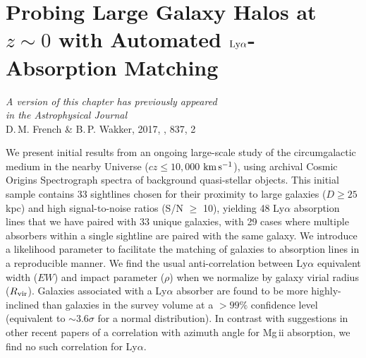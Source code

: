 \chapter[Probing Large Galaxy Halos at $z\sim0$ with Automated $\rm Ly\alpha$-Absorption Matching]{Probing Large Galaxy Halos at $z\sim0$ with Automated $\rm L \MakeLowercase{y} \alpha$-Absorption Matching} 
\label{chap:chap3}


\vfill


\begin{flushright}
    \fixspacing %
    \textit{A version of this chapter has previously appeared\\
        in the \emph{Astrophysical Journal}} \\ \vspace{1ex}
     D.\,M. French \& B.\,P. Wakker, 2017, \apj, 837, 2
\end{flushright}

\vspace*{1in} %

\cleardoublepage


\begin{chabstract}

We present initial results from an ongoing large-scale study of the circumgalactic medium in the nearby Universe ($cz \leq 10,000$ $\rm km\, s^{-1}$), using archival Cosmic Origins Spectrograph spectra of background quasi-stellar objects. This initial sample contains 33 sightlines chosen for their proximity to large galaxies ($D\geq25$ kpc) and high signal-to-noise ratios (S/N $\geq$ 10), yielding 48 Ly$\alpha$ absorption lines that we have paired with 33 unique galaxies, with 29 cases where multiple absorbers within a single sightline are paired with the same galaxy. We introduce a likelihood parameter to facilitate the matching of galaxies to absorption lines in a reproducible manner. We find the usual anti-correlation between Ly$\alpha$ equivalent width ($EW$) and impact parameter ($\rho$) when we normalize by galaxy virial radius ($R_{\rm vir}$). Galaxies associated with a Ly$\alpha$ absorber are found to be more highly-inclined than galaxies in the survey volume at a $>99\%$ confidence level (equivalent to $\sim 3.6 \sigma$ for a normal distribution). In contrast with suggestions in other recent papers of a correlation with azimuth angle for Mg\,{\sc ii} absorption, we find no such correlation for Ly$\alpha$.

\end{chabstract}


